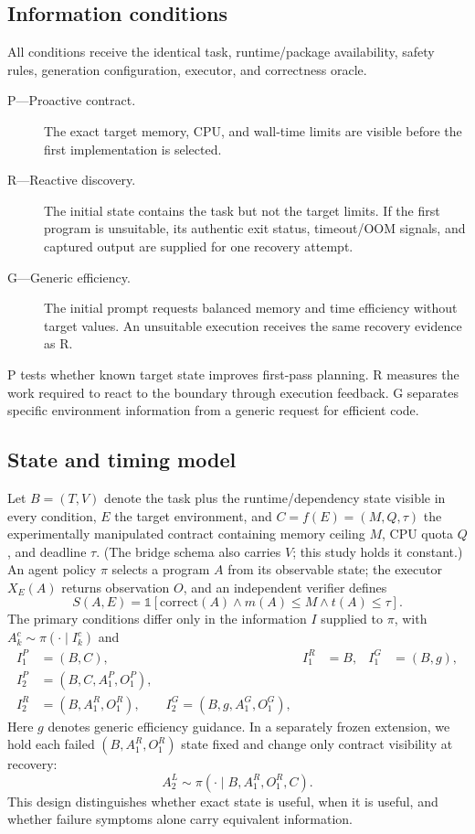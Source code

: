 \documentclass[sigconf,anonymous]{aamas}
\begin{document}
\subsection{Information conditions}

All conditions receive the identical task, runtime/package availability, safety
rules, generation configuration, executor, and correctness oracle.
\begin{description}
  \item[P---Proactive contract.] The exact target memory, CPU, and wall-time
  limits are visible before the first implementation is selected.
  \item[R---Reactive discovery.] The initial state contains the task but not the
  target limits. If the first program is unsuitable, its authentic exit status,
  timeout/OOM signals, and captured output are supplied for one recovery attempt.
  \item[G---Generic efficiency.] The initial prompt requests balanced memory and
  time efficiency without target values. An unsuitable execution receives the
  same recovery evidence as R.
\end{description}

P tests whether known target state improves first-pass planning. R measures the
work required to react to the boundary through execution feedback. G separates
specific environment information from a generic request for efficient code.

\subsection{State and timing model}

Let $B=(T,V)$ denote the task plus the runtime/dependency state visible in every
condition, $E$ the target environment, and $C=f(E)=(M,Q,\tau)$ the experimentally
manipulated contract containing memory ceiling $M$, CPU quota $Q$, and deadline
$\tau$. (The bridge schema also carries $V$; this study holds it constant.) An agent
policy $\pi$ selects a program $A$ from its observable state; the executor
$X_E(A)$ returns observation $O$, and an independent verifier defines
\begin{equation}
S(A,E)=\mathbb{1}[\mathrm{correct}(A)\land m(A)\le M\land t(A)\le\tau].
\end{equation}
The primary conditions differ only in the information $I$ supplied to $\pi$,
with $A_k^c\sim\pi(\cdot\mid I_k^c)$ and
\begin{align}
I_1^P&=(B,C), & I_1^R&=B, & I_1^G&=(B,g),\\
I_2^P&=(B,C,A_1^P,O_1^P),\nonumber\\
I_2^R&=(B,A_1^R,O_1^R),\qquad
I_2^G=(B,g,A_1^G,O_1^G),
\end{align}
Here $g$ denotes generic efficiency guidance. In a separately frozen extension,
we hold each failed $(B,A_1^R,O_1^R)$ state fixed and change only contract
visibility at recovery:
\begin{equation}
A_2^L\sim\pi(\cdot\mid B,A_1^R,O_1^R,C).
\end{equation}
This design distinguishes whether exact state is useful, when it is useful, and
whether failure symptoms alone carry equivalent information.
\end{document}
